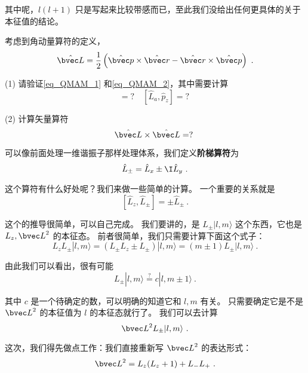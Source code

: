 其中呢，$l(l+1)$ 只是写起来比较带感而已，至此我们没给出任何更具体的关于本征值的结论。

\begin{exercise}{}
考虑到角动量算符的定义，
\begin{equation}
{\hat{\bvec L}} = \displaystyle\frac{1}{2}\left({\hat{\bvec p}}\times {\hat{\bvec r}} - {\hat{\bvec r}}\times {\hat{\bvec p}}\right)~.
\end{equation}

(1) 请验证\autoref{eq_QMAM_1} 和\autoref{eq_QMAM_2}，其中需要计算
\begin{equation}
[\hat L_a, \hat r_b] = ? \quad [\hat L_a, \hat p_z] = ? ~
\end{equation}

(2) 计算矢量算符
\begin{equation}
\hat{\bvec L}\times \hat{\bvec L} = ?~
\end{equation}
\end{exercise}

可以像前面处理一维谐振子那样处理体系，我们定义\textbf{阶梯算符}为
\begin{equation}
\hat L_{\pm} = \hat L_x \pm \I\hat L_y~.
\end{equation}

这个算符有什么好处呢？我们来做一些简单的计算。 一个重要的关系就是
\begin{equation}\label{eq_QMAM_10}
[\hat L_z, \hat L_{\pm}] = \pm \hat L_{\pm}~.
\end{equation}

这个的推导很简单，可以自己完成。 我们要讲的，是 $L_{\pm}|l,m\rangle$ 这个东西，它也是 $L_z, {\bvec L}^2$ 的本征态。 前者很简单，我们只需要计算下面这个式子：
\begin{equation}
L_z L_{\pm}|l,m\rangle = (L_{\pm}L_z \pm L_{\pm})|l,m\rangle = (m\pm 1)L_{\pm}|l,m\rangle~.
\end{equation}

由此我们可以看出，很有可能
\begin{equation}
L_{\pm}|l,m\rangle \overset{?}{=} c|l,m\pm1\rangle~.
\end{equation}

其中 $c$ 是一个待确定的数，可以明确的知道它和 $l,m$ 有关。 只需要确定它是不是 ${\bvec L}^2$ 的本征值为 $l$ 的本征态就行了。 我们可以去计算
\begin{equation}
{\bvec L}^2L_{\pm}|l,m\rangle~.
\end{equation}

这次，我们得先做点工作：我们直接重新写 ${\bvec L}^2$ 的表达形式：
\begin{equation}
{\bvec L}^2 = L_z(L_z+1)+L_-L_+~.
\end{equation}

